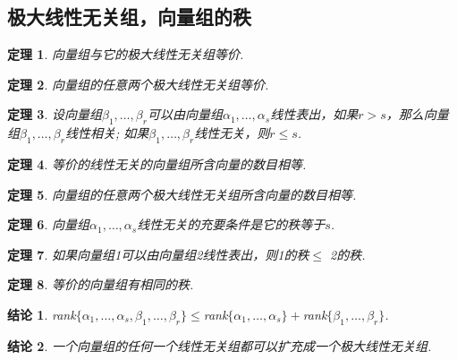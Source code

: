 \documentclass[UTF8]{article}
\newtheorem{thrm}{定理}[subsection]
\newtheorem{ccl}{结论}[subsection]
\begin{document}
\subsection{极大线性无关组，向量组的秩}
\begin{thrm}
  向量组与它的极大线性无关组等价.
\end{thrm}
\begin{thrm}
  向量组的任意两个极大线性无关组等价.
\end{thrm}
\begin{thrm}
  设向量组$\beta_1,\ldots,\beta_r$可以由向量组$\alpha_1,\ldots,\alpha_s$线性表出，如果$r>s$，那么向量组$\beta_1,\ldots,\beta_r$线性相关;
  如果$\beta_1,\ldots,\beta_r$线性无关，则$r\le s$.
\end{thrm}
\begin{thrm}
  等价的线性无关的向量组所含向量的数目相等.
\end{thrm}
\begin{thrm}
  向量组的任意两个极大线性无关组所含向量的数目相等.
\end{thrm}
\begin{thrm}
  向量组$\alpha_1,\ldots,\alpha_s$线性无关的充要条件是它的秩等于$s$.
\end{thrm}
\begin{thrm}
  如果向量组1可以由向量组2线性表出，则1的秩$\le$ 2的秩.
\end{thrm}
\begin{thrm}
  等价的向量组有相同的秩.
\end{thrm}
\begin{ccl}
  rank$\{\alpha_1,\ldots,\alpha_s,\beta_1,\ldots,\beta_r\} \le $rank$\{\alpha_1,\ldots,\alpha_s\}+$rank$\{\beta_1,\ldots,\beta_r\}$.
\end{ccl}
\begin{ccl}
  一个向量组的任何一个线性无关组都可以扩充成一个极大线性无关组.
\end{ccl}
\end{document}
